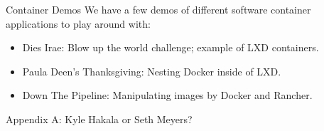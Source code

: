 \documentclass[xcolor=dvipsnames,aspectratio=1610]{beamer}
\begin{document}
  \begin{frame}{Container Demos}
      We have a few demos of different software container applications to play around with: \newline
      \begin{itemize}
        \setlength\itemsep{1.6em}
        \item Dies Irae: Blow up the world challenge; example of LXD containers.
        \item Paula Deen's Thanksgiving: Nesting Docker inside of LXD.
        \item Down The Pipeline: Manipulating images by Docker and Rancher.
      \end{itemize}

  \end{frame}

  \begin{frame}{Appendix A: Kyle Hakala or Seth Meyers?}


\end{frame}
\end{document}
